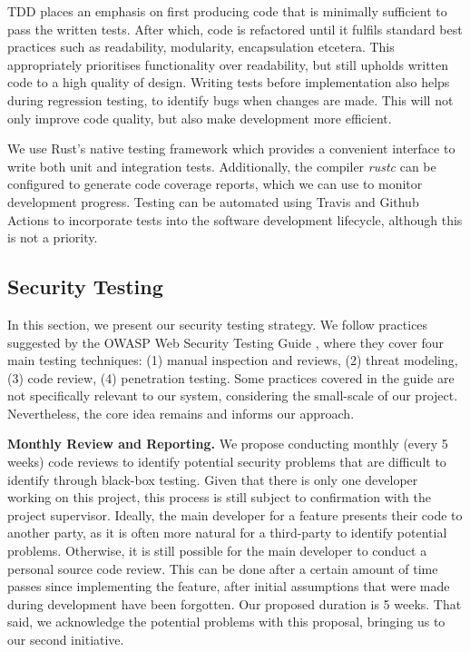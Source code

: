 TDD places an emphasis on first producing code that is minimally sufficient to pass the written tests. After which, code is refactored until it fulfils standard best practices such as readability, modularity, encapsulation etcetera. This appropriately prioritises functionality over readability, but still upholds written code to a high quality of design. Writing tests before implementation also helps during regression testing, to identify bugs when changes are made. This will not only improve code quality, but also make development more efficient. 

We use Rust's native testing framework which provides a convenient interface to write both unit and integration tests. Additionally, the compiler \textit{rustc} can be configured to generate code coverage reports, which we can use to monitor development progress. Testing can be automated using Travis and Github Actions to incorporate tests into the software development lifecycle, although this is not a priority.

\subsection{Security Testing}
\label{sec:security_testing}
In this section, we present our security testing strategy. We follow practices suggested by the OWASP Web Security Testing Guide \cite{OWASPv4.2}, where they cover four main testing techniques: (1) manual inspection and reviews, (2) threat modeling, (3) code review, (4) penetration testing. Some practices covered in the guide are not specifically relevant to our system, considering the small-scale of our project. Nevertheless, the core idea remains and informs our approach.

\textbf{Monthly Review and Reporting.} We propose conducting monthly (every 5 weeks) code reviews to identify potential security problems that are difficult to identify through black-box testing. Given that there is only one developer working on this project, this process is still subject to confirmation with the project supervisor. Ideally, the main developer for a feature presents their code to another party, as it is often more natural for a third-party to identify potential problems. Otherwise, it is still possible for the main developer to conduct a personal source code review. This can be done after a certain amount of time passes since implementing the feature, after initial assumptions that were made during development have been forgotten. Our proposed duration is 5 weeks. That said, we acknowledge the potential problems with this proposal, bringing us to our second initiative. 

